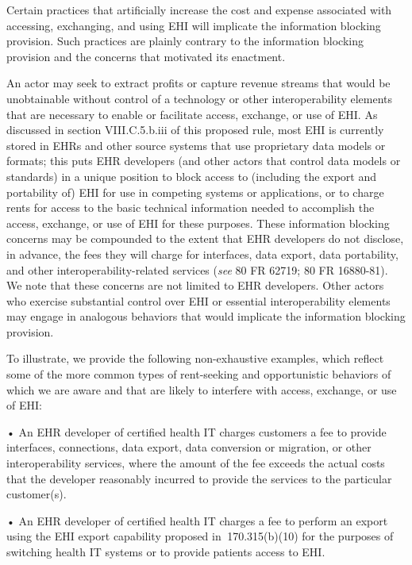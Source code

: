 \documentclass[twoside,11pt]{article}
\begin{document}
          Certain practices that artificially increase the cost and expense associated with accessing, exchanging, and using EHI will implicate the information blocking provision. Such practices are plainly contrary to the information blocking provision and the concerns that motivated its enactment.



          An actor may seek to extract profits or capture revenue streams that would be unobtainable without control of a technology or other interoperability elements that are necessary to enable or facilitate access, exchange, or use of EHI. As discussed in section VIII.C.5.b.iii of this proposed rule, most EHI is currently stored in EHRs and other source systems that use proprietary data models or formats; this puts EHR developers (and other actors that control data models or standards) in a unique position to block access to (including the export and portability of) EHI for use in competing systems or applications, or to charge rents for access to the basic technical information needed to accomplish the access, exchange, or use of EHI for these purposes. These information blocking concerns may be compounded to the extent that EHR developers do not disclose, in advance, the fees they will charge for interfaces, data export, data portability, and other interoperability-related services (\emph{see} 80 FR 62719; 80 FR 16880-81). We note that these concerns are not limited to EHR developers. Other actors who exercise substantial control over EHI or essential interoperability elements may engage in analogous behaviors that would implicate the information blocking provision. \ifhmode\expandafter\xspace\fi 
          


          To illustrate, we provide the following non-exhaustive examples, which reflect some of the more common types of rent-seeking and opportunistic behaviors of which we are aware and that are likely to interfere with access, exchange, or use of EHI:


          • An EHR developer of certified health IT charges customers a fee to provide interfaces, connections, data export, data conversion or migration, or other interoperability services, where the amount of the fee exceeds the actual costs that the developer reasonably incurred to provide the services to the particular customer(s).


          • An EHR developer of certified health IT charges a fee to perform an export using the EHI export capability proposed in \textsection{} 170.315(b)(10) for the purposes of switching health IT systems or to provide patients access to EHI.
\end{document}

